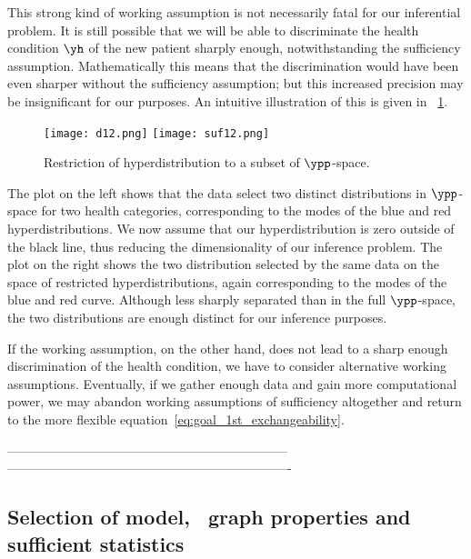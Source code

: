 This strong kind of working assumption is not necessarily fatal for our
inferential problem. It is still possible that we will be able to
discriminate the health condition $\yh$ of the new patient sharply
enough, notwithstanding the sufficiency assumption. Mathematically this
means that the discrimination would have been even sharper without the
sufficiency assumption; but this increased precision may be insignificant
for our purposes. An intuitive illustration of this is given in
\fig~\ref{restriction_hyperdistribution}.
\begin{figure}[!h]
  \centering
\texttt{[image: d12.png]}%
\texttt{[image: suf12.png]}%
\caption{Restriction of hyperdistribution to a subset of $\ypp$-space.}
\label{restriction_hyperdistribution}
\end{figure}
The plot on the left shows that the data
select two distinct distributions in $\ypp$-space for two health categories,
corresponding to the modes of the blue and red hyperdistributions. We now
assume that our hyperdistribution is zero outside of the black line, thus reducing
the dimensionality of our inference problem. The plot on the right shows
the two distribution selected by the same data on the space of restricted
hyperdistributions, again corresponding to the modes of the blue and red curve.
Although less sharply separated than in the full $\ypp$-space, the two
distributions are enough distinct for our inference purposes.



If the working assumption, on the other hand, does not lead to a sharp
enough discrimination of the health condition, we have to consider
alternative working assumptions. Eventually, if we gather enough data and
gain more computational power, we may abandon working assumptions of
sufficiency altogether and return to the more flexible
equation~\eqref{eq:goal_1st_exchangeability}.





------------------------------------------------------------------
-------------------------------------------------------------------


\subsection{Selection of model, \ie\ graph properties and sufficient statistics}
\label{sec:model_selection}


\citetext{\citealp{mackay1992}; \citealp[\chaps~20, 4]{jaynes1994_r2003};
  \citealp[\chaps~V--VI]{jeffreys1939_r2003}; \citealp{lewisetal1997}}

